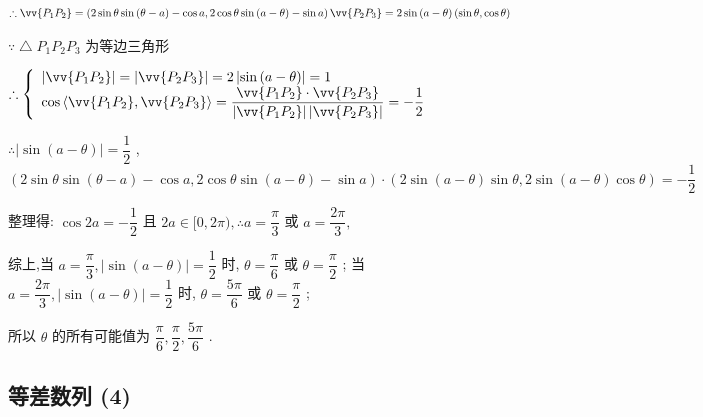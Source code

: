 \begin{enumerate}
\begin{jieda}
\begin{enumerate}
        $\therefore \vv{{P}_{1}{P}_{2}} = \left( {2\sin \theta \sin \left( {\theta  - a}\right)  - \cos a,2\cos \theta \sin \left( {a - \theta }\right)  - \sin a}\right) \\
        \vv{{P}_{2}{P}_{3}} = 2\sin \left( {a - \theta }\right) \left( {\sin \theta ,\cos \theta }\right)$ 
        
        $\because  \bigtriangleup  {P}_{1}{P}_{2}{P}_{3}$ 为等边三角形
        
        $\therefore \left\{  \begin{array}{l} \left| \vv{{P}_{1}{P}_{2}}\right|  = \left| \vv{{P}_{2}{P}_{3}}\right|  = 2\left| {\sin \left( {a - \theta }\right) }\right|  = 1 \\  \cos \left\langle  {\vv{{P}_{1}{P}_{2}},\vv{{P}_{2}{P}_{3}}}\right\rangle   = \dfrac{\vv{{P}_{1}{P}_{2}} \cdot  \vv{{P}_{2}{P}_{3}}}{\left| \vv{{P}_{1}{P}_{2}}\right| \left| \vv{{P}_{2}{P}_{3}}\right| } =  - \dfrac{1}{2} \end{array}\right.$
        
        $\therefore \left| {\sin \left( {a - \theta }\right) }\right|  = \dfrac{1}{2}$ , \\
        $\left( {2\sin \theta \sin \left( {\theta  - a}\right)  - \cos a,2\cos \theta \sin \left( {a - \theta }\right)  - \sin a}\right)  \cdot  \left( {2\sin \left( {a - \theta }\right) \sin \theta ,2\sin \left( {a - \theta }\right) \cos \theta }\right)  =  - \dfrac{1}{2}$ 
        
        整理得: $\cos {2a} =  - \dfrac{1}{2}$ 且
        ${2a} \in  \lbrack 0,{2\pi }),\therefore a = \dfrac{\pi }{3}$ 或 $a = \dfrac{2\pi }{3},$
        
        综上,当 $a = \dfrac{\pi }{3},\left| {\sin \left( {a - \theta }\right) }\right|  = \dfrac{1}{2}$ 时, $\theta  = \dfrac{\pi }{6}$ 或 $\theta  = \dfrac{\pi }{2}$ ;
        当 $a = \dfrac{2\pi }{3},\left| {\sin \left( {a - \theta }\right) }\right|  = \dfrac{1}{2}$ 时, $\theta  = \dfrac{5\pi }{6}$ 或 $\theta  = \dfrac{\pi }{2}$ ;
        
        所以 $\theta$ 的所有可能值为 $\dfrac{\pi }{6},\dfrac{\pi }{2},\dfrac{5\pi }{6}$ .
    \end{enumerate}
    \end{jieda}
\end{enumerate}
\clearpage

\subsection*{等差数列 (4)}

